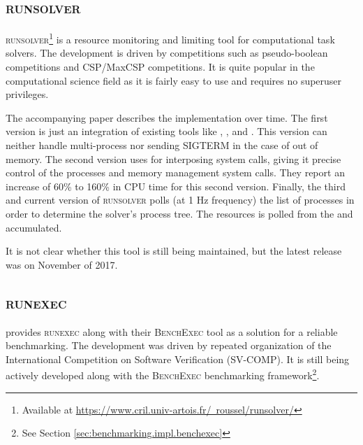 

\subsection{\textsc{runsolver}}
\label{sec:resource.impl.runsolver}

\textsc{runsolver}\footnote{Available at \href{https://www.cril.univ-artois.fr/~roussel/runsolver/}{https://www.cril.univ-artois.fr/~roussel/runsolver/}} \citep{rousselControllingSolverExecution2011} is a resource monitoring and limiting tool for computational task solvers.
The development is driven by competitions such as pseudo-boolean competitions and CSP/MaxCSP competitions.
It is quite popular in the computational science field as it is fairly easy to use and requires no superuser privileges.

The accompanying paper describes the implementation over time.
The first version is just an integration of existing tools like , , and .
This version can neither handle multi-process nor sending SIGTERM in the case of out of memory.
The second version uses  for interposing system calls, giving it precise control of the processes and memory management system calls.
They report an increase of 60\% to 160\% in CPU time for this second version.
Finally, the third and current version of \textsc{runsolver} polls (at 1 Hz frequency) the list of processes in order to determine the solver's process tree.
The resources is polled from the  and accumulated.

It is not clear whether this tool is still being maintained, but the latest release was on November of 2017.


\subsection{\textsc{runexec}}

\citet{beyerReliableBenchmarkingRequirements2019} provides \textsc{runexec} along with their \textsc{BenchExec} tool as a solution for a reliable benchmarking.
The development was driven by repeated organization of the International Competition on Software Verification (SV-COMP).
It is still being actively developed along with the \textsc{BenchExec} benchmarking framework\footnote{See Section \ref{sec:benchmarking.impl.benchexec}}.

